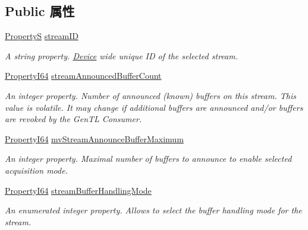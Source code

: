 \subsection*{Public 属性}
\begin{DoxyCompactItemize}
\item 
\hyperlink{classmv_i_m_p_a_c_t_1_1acquire_1_1_property_s}{Property\+S} \hyperlink{classmv_i_m_p_a_c_t_1_1acquire_1_1_gen_i_cam_1_1_data_stream_module_aaab634dd91e5fac930fa661918d8b0f8}{stream\+I\+D}
\begin{DoxyCompactList}\small\item\em A string property. \hyperlink{classmv_i_m_p_a_c_t_1_1acquire_1_1_device}{Device} wide unique I\+D of the selected stream. \end{DoxyCompactList}\item 
\hyperlink{group___common_interface_ga81749b2696755513663492664a18a893}{Property\+I64} \hyperlink{classmv_i_m_p_a_c_t_1_1acquire_1_1_gen_i_cam_1_1_data_stream_module_a2201f31acb5ff5b785d8a746cda383de}{stream\+Announced\+Buffer\+Count}
\begin{DoxyCompactList}\small\item\em An integer property. Number of announced (known) buffers on this stream. This value is volatile. It may change if additional buffers are announced and/or buffers are revoked by the Gen\+T\+L Consumer. \end{DoxyCompactList}\item 
\hyperlink{group___common_interface_ga81749b2696755513663492664a18a893}{Property\+I64} \hyperlink{classmv_i_m_p_a_c_t_1_1acquire_1_1_gen_i_cam_1_1_data_stream_module_acf7cc30058bb28b05c725ba0a2657617}{mv\+Stream\+Announce\+Buffer\+Maximum}
\begin{DoxyCompactList}\small\item\em An integer property. Maximal number of buffers to announce to enable selected acquisition mode. \end{DoxyCompactList}\item 
\hyperlink{group___common_interface_ga81749b2696755513663492664a18a893}{Property\+I64} \hyperlink{classmv_i_m_p_a_c_t_1_1acquire_1_1_gen_i_cam_1_1_data_stream_module_a4641a6c84bb270821225acc34cc106ac}{stream\+Buffer\+Handling\+Mode}
\begin{DoxyCompactList}\small\item\em An enumerated integer property. Allows to select the buffer handling mode for the stream. \end{DoxyCompactList}\item 

\end{DoxyCompactItemize}
